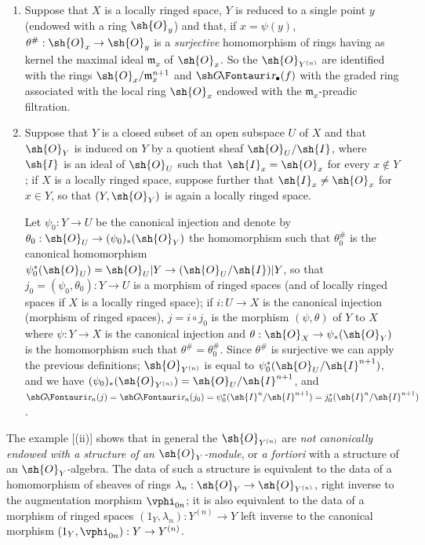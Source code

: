 \begin{examples}[16.1.3]
\label{IV.16.1.3}
\medskip\noindent
\begin{enumerate}
  \item[(i)] Suppose that $X$ is a locally ringed space, $Y$ is reduced to a single point $y$ (endowed with a ring $\sh{O}_y$) and that, if $x = \psi(y)$, $\theta^\#:\sh{O}_x \to \sh{O}_y$ is a \emph{surjective} homomorphism of rings having as kernel the maximal ideal $\mathfrak{m}_x$ of $\sh{O}_x$.
  So the $\sh{O}_{Y^{(n)}}$ are identified with the rings $\sh{O}_x/\mathfrak{m}_x^{n+1}$ and $\shGr_\bullet(f)$ with the graded ring associated with the local ring $\sh{O}_x$ endowed with the $\mathfrak{m}_x$-preadic filtration.
  \item[(ii)] Suppose that $Y$ is a closed subset of an open subspace $U$ of $X$ and that $\sh{O}_Y$ is induced on $Y$ by a quotient sheaf $\sh{O}_U/\sh{I}$, where $\sh{I}$ is an ideal of $\sh{O}_U$ such that $\sh{I}_x = \sh{O}_x$ for every $x \not\in Y$;
  if $X$ is a locally ringed space, suppose further that $\sh{I}_x \neq \sh{O}_x$ for $x \in Y$, so that $(Y, \sh{O}_Y)$ is again a locally ringed space.
  
  Let $\psi_0: Y \to U$ be the canonical injection and denote by $\theta_0: \sh{O}_U \to (\psi_0)_*(\sh{O}_Y)$ the homomorphism such that $\theta_0^\#$ is the canonical homomorphism $\psi^*_0(\sh{O}_U) = \sh{O}_U|Y \to (\sh{O}_U/\sh{I})|Y$, so that $j_0=(\psi_0, \theta_0):Y \to U$ is a morphism of ringed spaces (and of locally ringed spaces if $X$ is a locally ringed space);
  if $i:U \to X$ is the canonical injection (morphism of ringed spaces), $j = i\circ j_0$ is the morphism $(\psi, \theta)$ of $Y$ to $X$ where $\psi: Y \to X$ is the canonical injection and $\theta:\sh{O}_X \to \psi_*(\sh{O}_Y)$ is the homomorphism such that $\theta^\# = \theta_0^\#$.
  Since $\theta^\#$ is surjective we can apply the previous definitions;
  $\sh{O}_{Y^{(n)}}$ is equal to $\psi^*_0(\sh{O}_U/\sh{I}^{n+1})$, and we have $(\psi_0)_*(\sh{O}_{Y^{(n)}} ) = \sh{O}_U/\sh{I}^{n+1}$, and $\shGr_n(j) = \shGr_n(j_0) = \psi^*_0(\sh{I}^n/\sh{I}^{n+1}) = j^*_0(\sh{I}^n/\sh{I}^{n+1})$.
\end{enumerate}
\end{examples}

\begin{env}[16.1.4]
\label{IV.16.1.4}
The example [(ii)] shows that in general the $\sh{O}_{Y^{(n)}}$ are \emph{not canonically endowed with a structure of an $\sh{O}_Y$-module}, or \emph{a fortiori} with a structure of an $\sh{O}_Y$-algebra.
The data of such a structure is equivalent to the data of a homomorphism of sheaves of rings $\lambda_n:\sh{O}_Y \to \sh{O}_{Y^{(n)}}$, right inverse to the augmentation morphism $\vphi_{0n}$;
it is also equivalent to the data of a morphism of ringed spaces $(1_Y, \lambda_n): Y^{(n)} \to Y$ left inverse to the canonical morphism $(1_Y, \vphi_{0n}): Y \to Y^{(n)}$.
\end{env}

